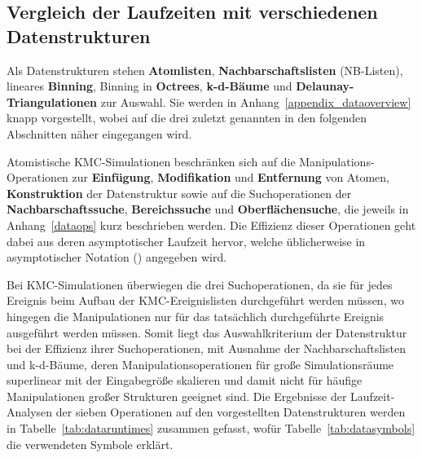 \subsection{Vergleich der Laufzeiten mit verschiedenen Datenstrukturen}

Als Datenstrukturen stehen \textbf{Atomlisten}, \textbf{Nachbarschaftslisten} (NB-Listen), lineares \textbf{Binning}, Binning in \textbf{Octrees}, \textbf{k-d-Bäume} und \textbf{Delaunay-Triangulationen} zur Auswahl\cite{skiena_algorithm_2011,press_numerical_2007}.
Sie werden in Anhang~\ref{appendix_dataoverview} knapp vorgestellt, wobei auf die drei zuletzt genannten in den folgenden Abschnitten näher eingegangen wird.

Atomistische KMC-Simulationen beschränken sich auf die Manipulations-Operationen zur \textbf{Einfügung}, \textbf{Modifikation} und \textbf{Entfernung} von Atomen, \textbf{Konstruktion} der Datenstruktur sowie auf die Suchoperationen der \textbf{Nachbarschaftssuche}, \textbf{Bereichssuche} und \textbf{Oberflächensuche}, die jeweils in Anhang~\ref{dataops} kurz beschrieben werden.
Die Effizienz dieser Operationen geht dabei aus deren asymptotischer Laufzeit hervor, welche üblicherweise in asymptotischer Notation (\BigO{}) angegeben wird.

Bei KMC-Simulationen überwiegen die drei Suchoperationen, da sie für jedes Ereignis beim Aufbau der KMC-Ereignislisten durchgeführt werden müssen, wo hingegen die Manipulationen nur für das tatsächlich durchgeführte Ereignis ausgeführt werden müssen.
Somit liegt das Auswahlkriterium der Datenstruktur bei der Effizienz ihrer Suchoperationen, mit Ausnahme der Nachbarschaftslisten und k-d-Bäume, deren Manipulationsoperationen für große Simulationsräume superlinear mit der Eingabegröße skalieren und damit nicht für häufige Manipulationen großer Strukturen geeignet sind.
Die Ergebnisse der Laufzeit-Analysen der sieben Operationen auf den vorgestellten Datenstrukturen werden in Tabelle~\ref{tab:dataruntimes} zusammen gefasst, wofür Tabelle~\ref{tab:datasymbols} die verwendeten Symbole erklärt.

